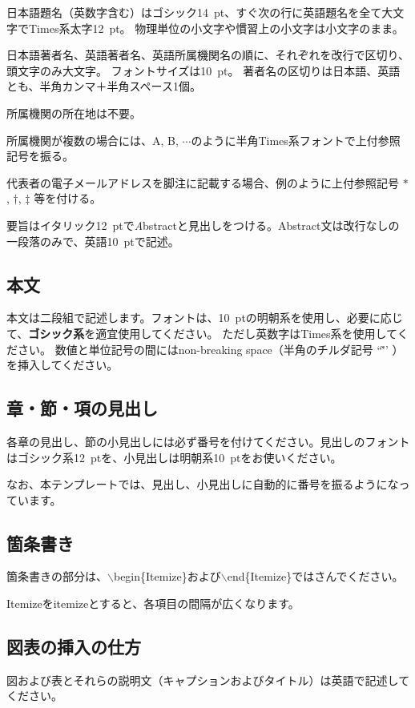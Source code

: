 \documentclass{PASJ2026}
\begin{document}
\begin{Itemize}
\item 日本語題名（英数字含む）はゴシック14~pt、すぐ次の行に英語題名を全て大文字でTimes系太字12~pt。
物理単位の小文字や慣習上の小文字は小文字のまま。
%
\item 日本語著者名、英語著者名、英語所属機関名の順に、それぞれを改行で区切り、頭文字のみ大文字。
フォントサイズは10~pt。
著者名の区切りは日本語、英語とも、半角カンマ＋半角スペース1個。
%
\item 所属機関の所在地は不要。
%
\item 所属機関が複数の場合には、A, B, $\cdots$のように半角Times系フォントで上付参照記号を振る。
%
\item 代表者の電子メールアドレスを脚注に記載する場合、例のように上付参照記号 $*$, $\dagger$, $\ddagger$ 等を付ける。
%
\item 要旨はイタリック12~ptで{\textit Abstract}と見出しをつける。Abstract文は改行なしの一段落のみで、英語10~ptで記述。
%
\end{Itemize}
%
\subsection{本文}

本文は二段組で記述します。フォントは、10~ptの明朝系を使用し、必要に応じて、{\textbf{ゴシック系}}を適宜使用してください。
ただし英数字はTimes系を使用してください。
数値と単位記号の間にはnon-breaking space（半角のチルダ記号 ``\~'' ）を挿入してください。
%
\subsection{章・節・項の見出し}
各章の見出し、節の小見出しには必ず番号を付けてください。見出しのフォントはゴシック系12~ptを、小見出しは明朝系10~ptをお使いください。

なお、本テンプレートでは、見出し、小見出しに自動的に番号を振るようになっています。
%
\subsection{箇条書き}
箇条書きの部分は、$\backslash$begin\{Itemize\}および$\backslash$end\{Itemize\}ではさんでください。

Itemizeをitemizeとすると、各項目の間隔が広くなります。
%
\subsection{図表の挿入の仕方}
図および表とそれらの説明文（キャプションおよびタイトル）は英語で記述してください。
\end{document}
